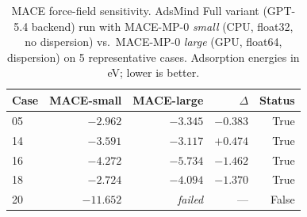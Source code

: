 \begin{table}[h]
\centering
\caption{MACE force-field sensitivity. AdsMind Full variant (GPT-5.4 backend) run with MACE-MP-0 \textit{small} (CPU, float32, no dispersion) vs.\ MACE-MP-0 \textit{large} (GPU, float64, dispersion) on 5 representative cases. Adsorption energies in eV; lower is better.}
\label{tab:si-mace-sensitivity}
\begin{tabular}{lrrrr}
\toprule
Case & MACE-small & MACE-large & $\Delta$ & Status \\
\midrule
  05 & $-2.962$ & $-3.345$ & $-0.383$ & True \\
  14 & $-3.591$ & $-3.117$ & $+0.474$ & True \\
  16 & $-4.272$ & $-5.734$ & $-1.462$ & True \\
  18 & $-2.724$ & $-4.094$ & $-1.370$ & True \\
  20 & $-11.652$ & \textit{failed} & --- & False \\
\bottomrule
\end{tabular}
\end{table}
